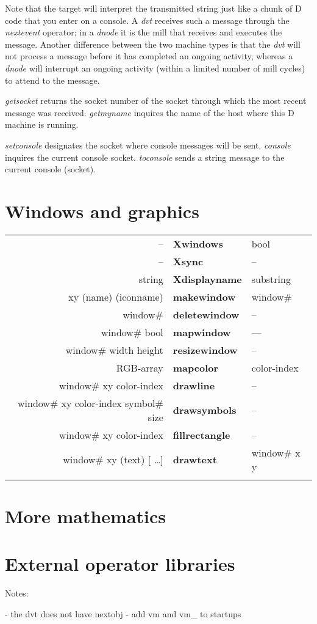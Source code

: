 Note that the target will interpret the transmitted string just like a chunk of D code that you enter on a console. A \emph{dvt} receives such a message through the \emph{nextevent} operator; in a \emph{dnode} it is the mill that receives and executes the message. Another difference between the two machine types is that the \emph{dvt} will not process a message before it has completed an ongoing activity, whereas a \emph{dnode} will interrupt an ongoing activity (within a limited number of mill cycles) to attend to the message.

\emph{getsocket} returns the socket number of the socket through which the most recent message was received. \emph{getmyname} inquires the name of the host where this D machine is running.

\emph{setconsole} designates the socket where console messages will be sent. \emph{console} inquires the current console socket. \emph{toconsole} sends a string message to the current console (socket).





\section{Windows and graphics}

\begin{tabular}{>{\sffamily}r>{\sffamily\bfseries}l>{\sffamily}l}
-- & Xwindows & bool\\
-- & Xsync & --\\
string & Xdisplayname & substring\\
xy (name) (iconname) & makewindow & window\#\\
window\# &deletewindow & --\\
window\# bool & mapwindow & ---\\
window\# width height & resizewindow & --\\
RGB-array & mapcolor & color-index\\
window\# xy color-index & drawline & --\\
window\# xy color-index symbol\# size & drawsymbols & --\\
window\# xy color-index & fillrectangle & --\\
window\# xy (text) [ \ldots ] & drawtext & window\# x y\\\\
\end{tabular}

\section{More mathematics}

\section{External operator libraries}


Notes:

- the dvt does not have nextobj
- add vm and vm_ to startups